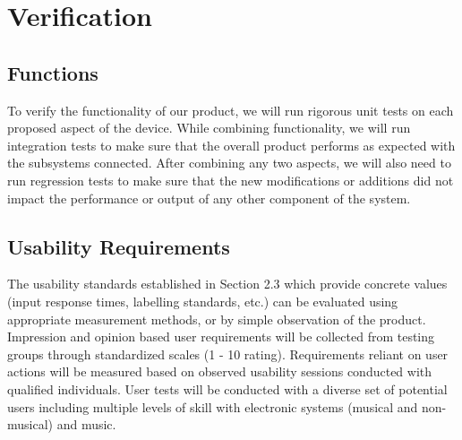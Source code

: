 \section{Verification}


\subsection{Functions}
    
    To verify the functionality of our product, we will run rigorous unit tests on each proposed aspect of the device. While combining functionality, we will run integration tests to make sure that the overall product performs as expected with the subsystems connected. After combining any two aspects, we will also need to run regression tests to make sure that the new modifications or additions did not impact the performance or output of any other component of the system.
    
   
\subsection{Usability Requirements}
The usability standards established in Section 2.3 which provide concrete values (input response times, labelling standards, etc.) can be evaluated using appropriate measurement methods, or by simple observation of the product. Impression and opinion based user requirements will be collected from testing groups through standardized scales (1 - 10 rating). Requirements reliant on user actions will be measured based on observed usability sessions conducted with qualified individuals. User tests will be conducted with a diverse set of potential users including multiple levels of skill with electronic systems (musical and non-musical) and music. 



